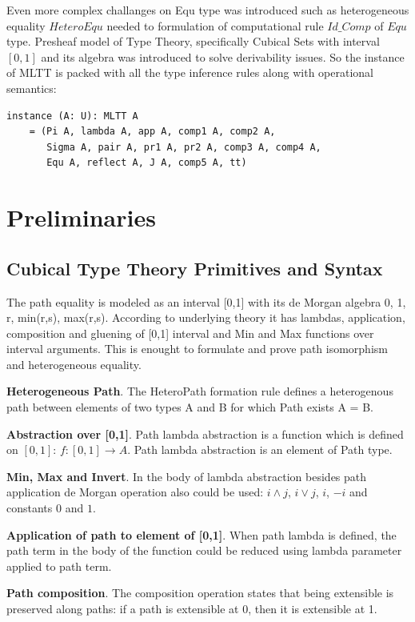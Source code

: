 \documentclass{article}
\begin{document}
Even more complex challanges on Equ type was introduced such
as heterogeneous equality $HeteroEqu$ needed to formulation
of computational rule $Id\_Comp$ of $Equ$ type. Presheaf model of Type Theory, specifically
Cubical Sets with interval $[0,1]$ and
its algebra was introduced to solve derivability issues. So the instance of MLTT is packed
with all the type inference rules along with operational semantics:

\begin{lstlisting}[mathescape=true]
instance (A: U): MLTT A
    = (Pi A, lambda A, app A, comp1 A, comp2 A,
       Sigma A, pair A, pr1 A, pr2 A, comp3 A, comp4 A,
       Equ A, reflect A, J A, comp5 A, tt)
\end{lstlisting}


\section{Preliminaries}

\subsection{Cubical Type Theory Primitives and Syntax}

The path equality is modeled as an interval [0,1] with
its de Morgan algebra 0, 1, r, min(r,s), max(r,s). According to underlying theory
it has lambdas, application, composition and gluening of [0,1] interval and Min and Max
functions over interval arguments. This is enought to formulate and prove path
isomorphism and heterogeneous equality.

{\bf Heterogeneous Path}. The HeteroPath formation rule defines a heterogenous path
between elements of two types A and B for which Path exists A = B.

{\bf Abstraction over [0,1]}. Path lambda abstraction is a function which is defined on $[0,1]$:
$f: [0,1] \rightarrow A$. Path lambda abstraction is an element of Path type.

{\bf Min, Max and Invert}. In the body of lambda abstraction besides path application
de Morgan operation also could be used: $i \wedge j$, $i \vee j$, $i$, $-i$ and constants $0$ and $1$.

{\bf Application of path to element of [0,1]}. When path lambda is defined, the path term
in the body of the function could be reduced using lambda parameter applied to path term.

{\bf Path composition}. The composition operation states that being extensible
is preserved along paths: if a path is extensible at 0, then it is extensible at 1.
\end{document}
